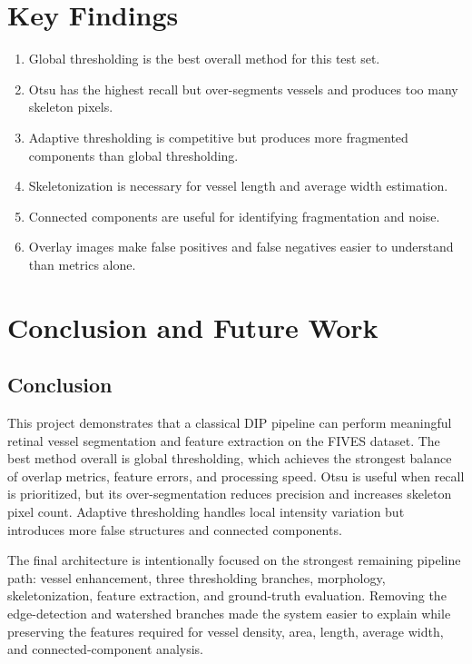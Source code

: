 \documentclass[12pt,a4paper]{article}
\begin{document}
\section{Key Findings}
\begin{enumerate}
    \item Global thresholding is the best overall method for this test set.
    \item Otsu has the highest recall but over-segments vessels and produces too many skeleton pixels.
    \item Adaptive thresholding is competitive but produces more fragmented components than global thresholding.
    \item Skeletonization is necessary for vessel length and average width estimation.
    \item Connected components are useful for identifying fragmentation and noise.
    \item Overlay images make false positives and false negatives easier to understand than metrics alone.
\end{enumerate}

\section{Conclusion and Future Work}
\subsection{Conclusion}
This project demonstrates that a classical DIP pipeline can perform meaningful retinal vessel segmentation and feature extraction on the FIVES dataset. The best method overall is global thresholding, which achieves the strongest balance of overlap metrics, feature errors, and processing speed. Otsu is useful when recall is prioritized, but its over-segmentation reduces precision and increases skeleton pixel count. Adaptive thresholding handles local intensity variation but introduces more false structures and connected components.

The final architecture is intentionally focused on the strongest remaining pipeline path: vessel enhancement, three thresholding branches, morphology, skeletonization, feature extraction, and ground-truth evaluation. Removing the edge-detection and watershed branches made the system easier to explain while preserving the features required for vessel density, area, length, average width, and connected-component analysis.
\end{document}
